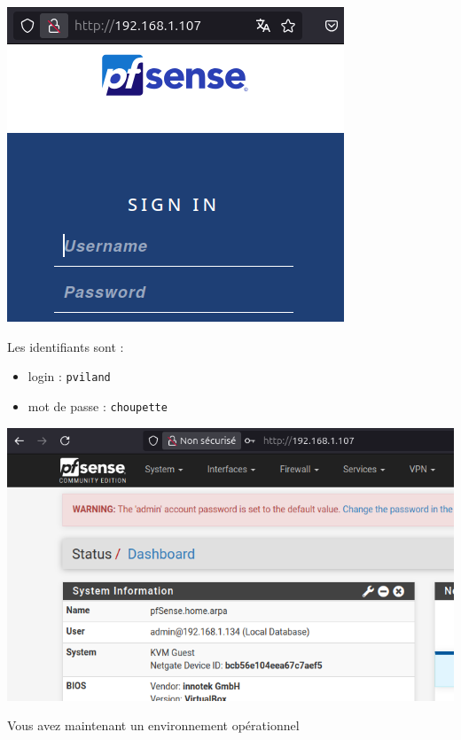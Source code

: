 \documentclass[french, 12pt]{article}%
\newcommand{\itemE}{\item[$\bullet$]}
\begin{document}
\begin{center}
\includegraphics[scale=0.7]{./ressource/pfsenseLog}
\end{center}

Les identifiants sont  : 
\begin{itemize}
\itemE login : \verb?pviland?
\itemE mot de passe : \verb?choupette?
\end{itemize}


\begin{center}
\includegraphics[scale=0.7]{./ressource/pfsenseIndex}
\end{center}

Vous avez maintenant un environnement opérationnel 
\end{document}
